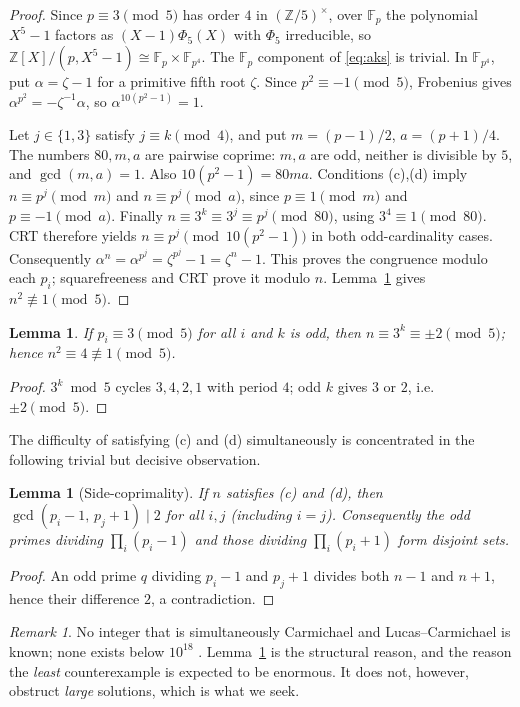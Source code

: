 \documentclass[11pt]{article}
\newtheorem{lemma}[theorem]{Lemma}
\theoremstyle{remark}
\newtheorem{remark}[theorem]{Remark}
\newcommand{\Z}{\mathbb{Z}}
\newcommand{\F}{\mathbb{F}}
\begin{document}
\begin{proof}
Since $p \equiv 3 \pmod 5$ has order $4$ in $(\Z/5)^\times$, over $\F_p$ the
polynomial $X^5-1$ factors as $(X-1)\Phi_5(X)$ with $\Phi_5$ irreducible, so
$\Z[X]/(p, X^5-1) \cong \F_p \times \F_{p^4}$. The $\F_p$ component of
\eqref{eq:aks} is trivial. In $\F_{p^4}$, put $\alpha=\zeta-1$ for a
primitive fifth root $\zeta$. Since $p^2\equiv-1\pmod5$, Frobenius gives
$\alpha^{p^2}=-\zeta^{-1}\alpha$, so $\alpha^{10(p^2-1)}=1$.

Let $j\in\{1,3\}$ satisfy $j\equiv k\pmod4$, and put
$m=(p-1)/2$, $a=(p+1)/4$. The numbers $80,m,a$ are pairwise coprime:
$m,a$ are odd, neither is divisible by $5$, and $\gcd(m,a)=1$.
Also $10(p^2-1)=80ma$. Conditions (c),(d) imply
$n\equiv p^j\pmod m$ and $n\equiv p^j\pmod a$, since $p\equiv1\pmod m$
and $p\equiv-1\pmod a$. Finally $n\equiv3^k\equiv3^j\equiv p^j\pmod{80}$,
using $3^4\equiv1\pmod{80}$. CRT therefore yields
$n\equiv p^j\pmod{10(p^2-1)}$ in both odd-cardinality cases.
Consequently $\alpha^n=\alpha^{p^j}=\zeta^{p^j}-1=\zeta^n-1$.
This proves the congruence modulo each $p_i$; squarefreeness and CRT prove
it modulo $n$. Lemma~\ref{lem:mod5} gives $n^2\not\equiv1\pmod5$.
\end{proof}

\begin{lemma}\label{lem:mod5}
If $p_i \equiv 3 \pmod 5$ for all $i$ and $k$ is odd, then
$n \equiv 3^k \equiv \pm 2 \pmod 5$; hence $n^2 \equiv 4 \not\equiv 1 \pmod 5$.
\end{lemma}
\begin{proof}
$3^k \bmod 5$ cycles $3, 4, 2, 1$ with period $4$; odd $k$ gives $3$ or $2$,
i.e.\ $\pm 2 \pmod 5$.
\end{proof}

The difficulty of satisfying (c) and (d) simultaneously is concentrated in the
following trivial but decisive observation.

\begin{lemma}[Side-coprimality]\label{lem:sides}
If $n$ satisfies (c) and (d), then $\gcd(p_i-1,\,p_j+1) \mid 2$ for all $i,j$
(including $i=j$). Consequently the odd primes dividing
$\prod_i (p_i-1)$ and those dividing $\prod_i (p_i+1)$ form disjoint sets.
\end{lemma}
\begin{proof}
An odd prime $q$ dividing $p_i-1$ and $p_j+1$ divides both $n-1$ and $n+1$,
hence their difference $2$, a contradiction.
\end{proof}

\begin{remark}
No integer that is simultaneously Carmichael and Lucas--Carmichael is known;
none exists below $10^{18}$ \cite{Pinch}. Lemma~\ref{lem:sides} is the
structural reason, and the reason the \emph{least} counterexample is expected
to be enormous. It does not, however, obstruct \emph{large} solutions, which is
what we seek.
\end{remark}
\end{document}
